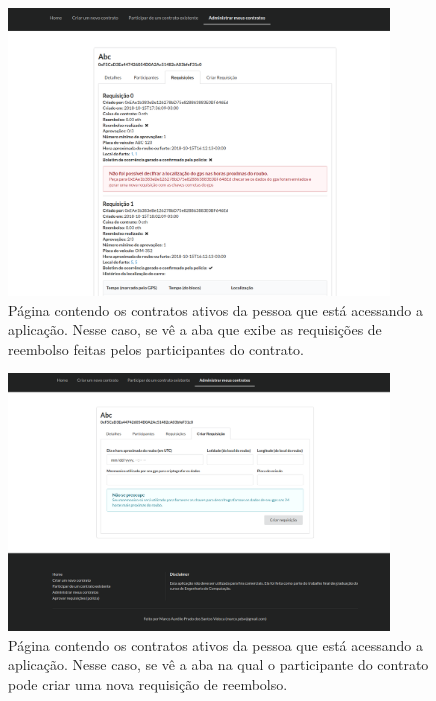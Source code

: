 \begin{figure}[h!]
\centering
\includegraphics[width=0.9\textwidth]{Cap2/my_contracts_requests.png}
\caption{Página contendo os contratos ativos da pessoa que está acessando a aplicação. Nesse caso, se vê a aba que exibe as requisições de reembolso feitas pelos participantes do contrato.}
\label{my_contracts_requests}
\end{figure}

\begin{figure}[h!]
\centering
\includegraphics[width=0.9\textwidth]{Cap2/my_contracts_new_request.png}
\caption{Página contendo os contratos ativos da pessoa que está acessando a aplicação. Nesse caso, se vê a aba na qual o participante do contrato pode criar uma nova requisição de reembolso.}
\label{my_contracts_new_request}
\end{figure}

